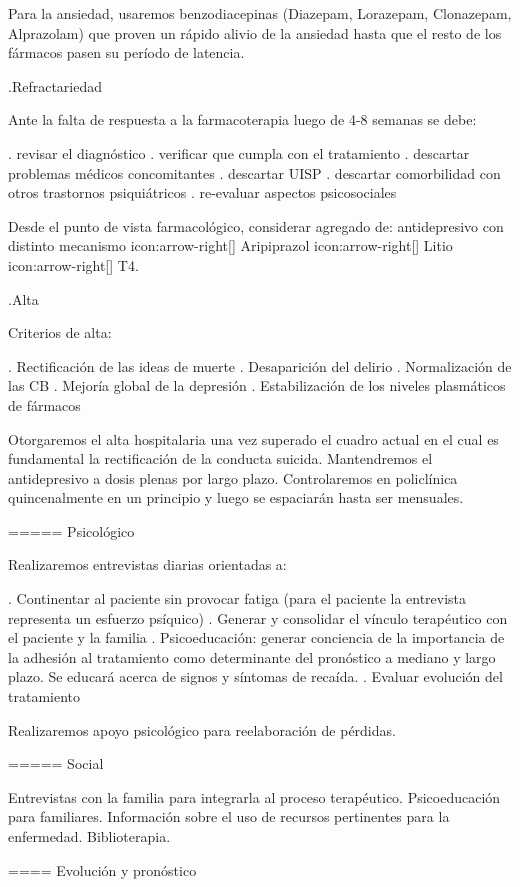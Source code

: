 Para la ansiedad, usaremos benzodiacepinas (Diazepam, Lorazepam, Clonazepam, Alprazolam) que proven un rápido alivio de la ansiedad hasta que el resto de los fármacos pasen su período de latencia.

.Refractariedad

Ante la falta de respuesta a la farmacoterapia luego de 4-8 semanas se debe:

. revisar el diagnóstico
. verificar que cumpla con el tratamiento
. descartar problemas médicos concomitantes
. descartar UISP
. descartar comorbilidad con otros trastornos psiquiátricos
. re-evaluar aspectos psicosociales

Desde el punto de vista farmacológico, considerar agregado de: antidepresivo con distinto mecanismo icon:arrow-right[] Aripiprazol icon:arrow-right[] Litio icon:arrow-right[] T4.

.Alta

Criterios de alta:

. Rectificación de las ideas de muerte
. Desaparición del delirio
. Normalización de las CB
. Mejoría global de la depresión
. Estabilización de los niveles plasmáticos de fármacos

Otorgaremos el alta hospitalaria una vez superado el cuadro actual en el cual es fundamental la rectificación de la conducta suicida. Mantendremos el antidepresivo a dosis plenas por largo plazo. Controlaremos en policlínica quincenalmente en un principio y luego se espaciarán hasta ser mensuales.

===== Psicológico

Realizaremos entrevistas diarias orientadas a:

. Continentar al paciente sin provocar fatiga (para el paciente la entrevista representa un esfuerzo psíquico)
. Generar y consolidar el vínculo terapéutico con el paciente y la familia
. Psicoeducación: generar conciencia de la importancia de la adhesión al tratamiento como determinante del pronóstico a mediano y largo plazo. Se educará acerca de signos y síntomas de recaída.
. Evaluar evolución del tratamiento

Realizaremos apoyo psicológico para reelaboración de pérdidas.

===== Social

Entrevistas con la familia para integrarla al proceso terapéutico. Psicoeducación para familiares. Información sobre el uso de recursos pertinentes para la enfermedad. Biblioterapia.

==== Evolución y pronóstico

